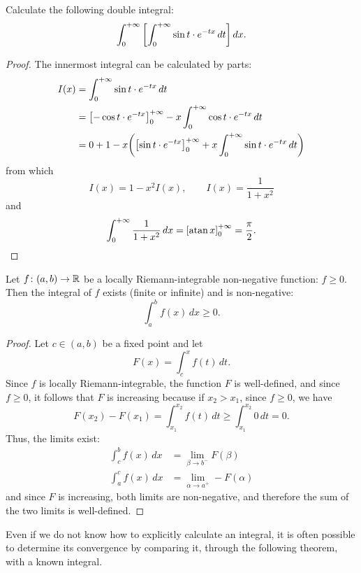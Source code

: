 \begin{exercise}\label{ex:821685}
  Calculate the following double integral:
  \[
    \int_0^{+\infty} {\left[ \int_0^{+\infty} \sin t \cdot e^{-tx}\, dt \right]}\, dx.
  \]
\end{exercise}
%
\begin{proof}
The innermost integral can be calculated by parts:
\begin{align*}
  I(x) &= \int_0^{+\infty} \sin t\cdot e^{-tx}\, dt \\
  &=  {\left[ -\cos t \cdot e^{-tx} \right]}_0^{+\infty}
    - x \int_0^{+\infty} \cos t \cdot e^{-tx}\, dt \\
  &= 0 + 1 - x{\left( {\left[ \sin t \cdot e^{-tx} \right]}_0^{+\infty} 
  +x \int_0^{+\infty}\sin t \cdot e^{-tx}\, dt \right)}
\end{align*}
from which 
\[
  I(x) = 1 - x^2 I(x), \qquad I(x) = \frac{1}{1+x^2}   
\]
and 
\[
 \int_0^{+\infty} \frac{1}{1+x^2}\, dx = {\left[ \operatorname{atan} x \right]}_0^{+\infty} = \frac \pi 2.
\]
\end{proof}

\begin{theorem}
\label{th:integrabilita_positive}
\mymark{**}
Let $f\colon (a,b)\to {\mathbb R}$ be a locally Riemann-integrable non-negative
function: $f\ge 0$. Then the integral of $f$ exists (finite or infinite) and is
non-negative:
\[
  \int_a^b f(x)\, dx \ge 0.
\]
\end{theorem}
%
\begin{proof}
\mymark{**}
Let $c\in (a,b)$ be a fixed point and let
\[
  F(x) = \int_c^x f(t)\, dt.
\]
Since $f$ is locally Riemann-integrable, the function $F$ is well-defined, and
since $f\ge 0$, it follows that $F$ is increasing because if $x_2>x_1$, since
$f\ge 0$, we have
\[
  F(x_2)-F(x_1) = \int_{x_1}^{x_2} f(t)\, dt \ge \int_{x_1}^{x_2} 0\, dt = 0.
\]
Thus, the limits exist:
\begin{align*}
  \int_c^b f(x)\, dx  &= \lim_{\beta\to b^-} F(\beta)\\
  \int_a^c f(x)\, dx  &= \lim_{\alpha\to a^+} -F(\alpha)
\end{align*}
and since $F$ is increasing, both limits are non-negative, and therefore the sum
of the two limits is well-defined.
\end{proof}

Even if we do not know how to explicitly calculate an integral, it is often
possible to determine its convergence by comparing it, through the following
theorem, with a known integral.

